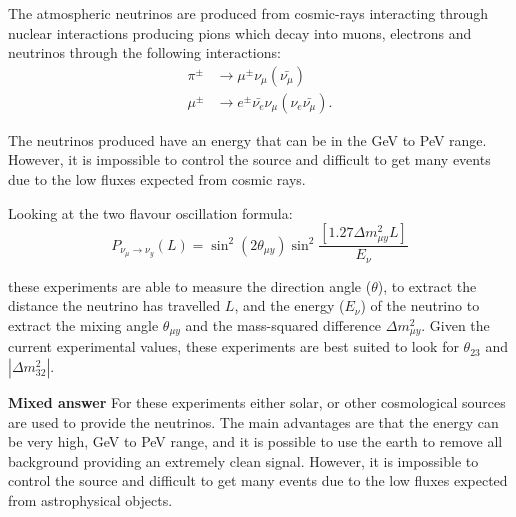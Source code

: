 The atmospheric neutrinos are produced from cosmic-rays interacting through nuclear interactions producing pions which decay into muons, electrons and neutrinos through the following interactions:
\begin{align}
\pi^{\pm} &\rightarrow \mu^{\pm}  \nu_\mu (\bar{\nu_\mu}) \\
\mu^{\pm} &\rightarrow e^{\pm} \bar{\nu_e}  \nu_\mu  (\nu_e \bar{\nu_\mu}).
\end{align}

The neutrinos produced have an energy that can be in the GeV to PeV range. However, it is impossible to control the source and difficult to get many events due to the low fluxes expected from cosmic rays. 

Looking at the two flavour oscillation formula:
\begin{equation}
P_{\nu_\mu \rightarrow \nu_y} (L) = \sin^2(2\theta_{\mu y})\sin^2 \frac{[1.27\Delta m_{\mu y}^2 L]}{E_\nu}
\end{equation}

these experiments are able to measure the direction angle ($\theta$), to extract the distance the neutrino has travelled $L$, and the energy ($E_\nu$) of the neutrino to extract the mixing angle $\theta_{\mu y}$ and the mass-squared difference $\Delta m^2_{\mu y}$. Given the current experimental values, these experiments are best suited to look for $\theta_{23}$ and $|\Delta m_{32}^2 |$.



\textbf{Mixed answer}
For these experiments either solar, or other cosmological sources are used to provide the neutrinos. The main advantages are that the energy can be very high, GeV to PeV range, and it is possible to use the earth to remove all background providing an extremely clean signal. However, it is impossible to control the source and difficult to get many events due to the low fluxes expected from astrophysical objects. 
\fi

